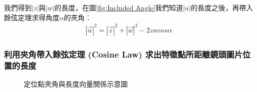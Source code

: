 	我們得到$|z|$與$|w|$的長度，在圖\ref{fig:Included Angle}我們知道$|u|$的長度之後，再帶入餘弦定理求得角度$\alpha$的夾角：
	\begin{align}
		|\vec{u}|^2 = |\vec{z}|^2 + |\vec{w}|^2 - 2zwcos\alpha
	\end{align}	
	
	\subsubsection{利用夾角帶入餘弦定理 (Cosine Law) 求出特徵點所距離鏡頭圖片位置的長度}
	
	\begin{figure}
    \begin{center}
    \end{center}
    \caption{定位點夾角與長度向量關係示意圖}
    \label{fig:Localization Relationship}
    \end{figure}


